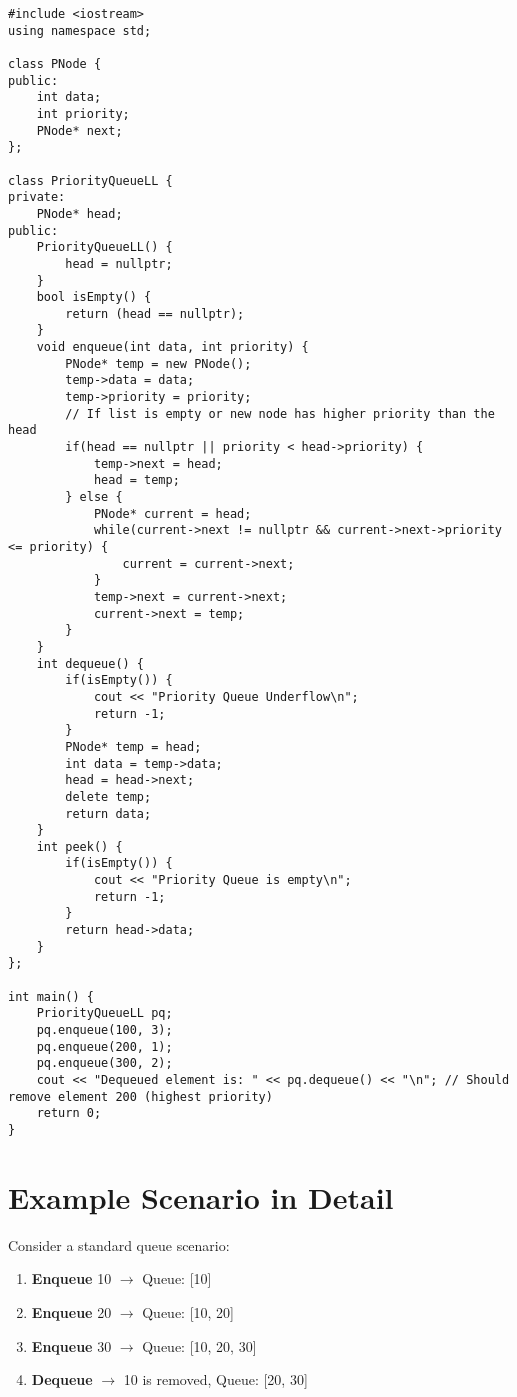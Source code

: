 \begin{lstlisting}[caption={C++ implementation of a Priority Queue using a Linked List}]
#include <iostream>
using namespace std;

class PNode {
public:
    int data;
    int priority;
    PNode* next;
};

class PriorityQueueLL {
private:
    PNode* head;
public:
    PriorityQueueLL() {
        head = nullptr;
    }
    bool isEmpty() {
        return (head == nullptr);
    }
    void enqueue(int data, int priority) {
        PNode* temp = new PNode();
        temp->data = data;
        temp->priority = priority;
        // If list is empty or new node has higher priority than the head
        if(head == nullptr || priority < head->priority) {
            temp->next = head;
            head = temp;
        } else {
            PNode* current = head;
            while(current->next != nullptr && current->next->priority <= priority) {
                current = current->next;
            }
            temp->next = current->next;
            current->next = temp;
        }
    }
    int dequeue() {
        if(isEmpty()) {
            cout << "Priority Queue Underflow\n";
            return -1;
        }
        PNode* temp = head;
        int data = temp->data;
        head = head->next;
        delete temp;
        return data;
    }
    int peek() {
        if(isEmpty()) {
            cout << "Priority Queue is empty\n";
            return -1;
        }
        return head->data;
    }
};

int main() {
    PriorityQueueLL pq;
    pq.enqueue(100, 3);
    pq.enqueue(200, 1);
    pq.enqueue(300, 2);
    cout << "Dequeued element is: " << pq.dequeue() << "\n"; // Should remove element 200 (highest priority)
    return 0;
}
\end{lstlisting}

\section{Example Scenario in Detail}
Consider a standard queue scenario:
\begin{enumerate}
    \item \textbf{Enqueue} 10 \(\rightarrow\) Queue: [10]
    \item \textbf{Enqueue} 20 \(\rightarrow\) Queue: [10, 20]
    \item \textbf{Enqueue} 30 \(\rightarrow\) Queue: [10, 20, 30]
    \item \textbf{Dequeue} \(\rightarrow\) 10 is removed, Queue: [20, 30]
\end{enumerate}

